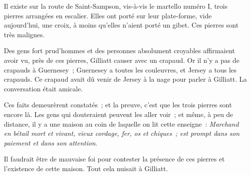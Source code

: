 \documentclass[french,twoside]{book} %
\begin{document}
Il existe sur la route de Saint-Sampson, vis-à-vis le martello numéro I, trois pierres arrangées en escalier. Elles ont porté sur leur plate-forme, vide aujourd’hui, une croix, à moins qu’elles n’aient porté un gibet. Ces pierres sont très malignes.\par
Des gens fort prud’hommes et des personnes absolument croyables affirmaient avoir vu, près de ces pierres, Gilliatt causer avec un crapaud. Or il n’y a pas de crapauds à Guernesey ; Guernesey a toutes les couleuvres, et Jersey a tous les crapauds. Ce crapaud avait dû venir de Jersey à la nage pour parler à Gilliatt. La conversation était amicale.\par
Ces faits demeurèrent constatés ; et la preuve, c’est que les trois pierres sont encore là. Les gens qui douteraient peuvent les aller voir ; et même, à peu de distance, il y a une maison au coin de laquelle on lit cette enseigne : \emph{Marchand en bétail mort et vivant, vieux cordage, fer, os et chiques ; est prompt dans son paiement et dans son attention}.\par
Il faudrait être de mauvaise foi pour contester la présence de ces pierres et l’existence de cette maison. Tout cela nuisait à Gilliatt.\par
\end{document}
